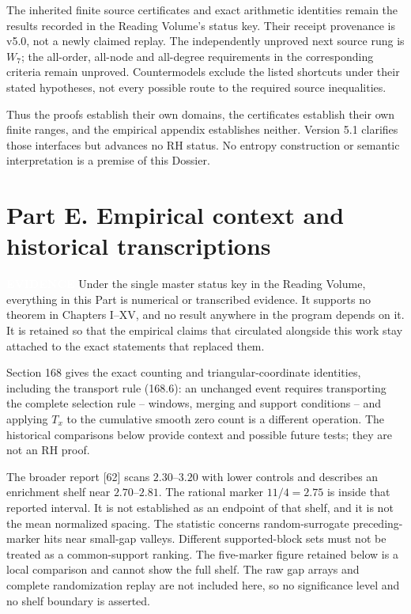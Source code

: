 \documentclass[
  11pt,
]{book}
\newcommand{\tnstatusbox}[2]{%
  {\setlength{\fboxsep}{2.1pt}%
   \colorbox{#1}{\textcolor{white}{\scriptsize\bfseries\hspace{0.5pt}#2\hspace{0.5pt}}}}}
\newcommand{\EVID}{\tnstatusbox{tnamber}{EVIDENCE}}
\begin{document}
The inherited finite source certificates and exact arithmetic identities
remain the results recorded in the Reading Volume's status key. Their
receipt provenance is v5.0, not a newly claimed replay. The
independently unproved next source rung is \(W_7\); the all-order,
all-node and all-degree requirements in the corresponding criteria
remain unproved. Countermodels exclude the listed shortcuts under their
stated hypotheses, not every possible route to the required source
inequalities.

Thus the proofs establish their own domains, the certificates establish
their own finite ranges, and the empirical appendix establishes neither.
Version 5.1 clarifies those interfaces but advances no RH status. No
entropy construction or semantic interpretation is a premise of this
Dossier.

\chapter{Part E. Empirical context and historical
transcriptions}\label{part-e.-empirical-context-and-historical-transcriptions}

\EVID{} Under the single master status key in the Reading Volume,
everything in this Part is numerical or transcribed evidence. It
supports no theorem in Chapters I--XV, and no result anywhere in the
program depends on it. It is retained so that the empirical claims that
circulated alongside this work stay attached to the exact statements
that replaced them.

Section 168 gives the exact counting and triangular-coordinate
identities, including the transport rule (168.6): an unchanged event
requires transporting the complete selection rule -- windows, merging
and support conditions -- and applying \(T_x\) to the cumulative smooth
zero count is a different operation. The historical comparisons below
provide context and possible future tests; they are not an RH proof.

The broader report {[}62{]} scans \(2.30\)--\(3.20\) with lower controls
and describes an enrichment shelf near \(2.70\)--\(2.81\). The rational
marker \(11/4=2.75\) is inside that reported interval. It is not
established as an endpoint of that shelf, and it is not the mean
normalized spacing. The statistic concerns random-surrogate
preceding-marker hits near small-gap valleys. Different supported-block
sets must not be treated as a common-support ranking. The five-marker
figure retained below is a local comparison and cannot show the full
shelf. The raw gap arrays and complete randomization replay are not
included here, so no significance level and no shelf boundary is
asserted.
\end{document}
